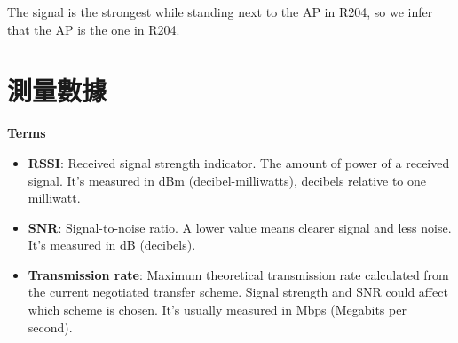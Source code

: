 \documentclass[12pt, a4paper]{article}
\begin{document}
  The signal is the strongest while standing next to the AP in R204, so we infer that
  the AP is the one in R204.

  \section{測量數據}
  \textbf{Terms}
  \begin{itemize}
    \item \textbf{RSSI}: Received signal strength indicator. The amount of
    power of a received signal. It's measured in dBm (decibel-milliwatts),
    decibels relative to one milliwatt.
    \item \textbf{SNR}: Signal-to-noise ratio. A lower value means clearer signal and less noise. It's measured in dB (decibels).
    \item \textbf{Transmission rate}: Maximum theoretical transmission rate
    calculated from the current negotiated transfer scheme. Signal strength and
    SNR could affect which scheme is chosen. It's usually measured in Mbps
    (Megabits per second).
  \end{itemize}
\end{document}
